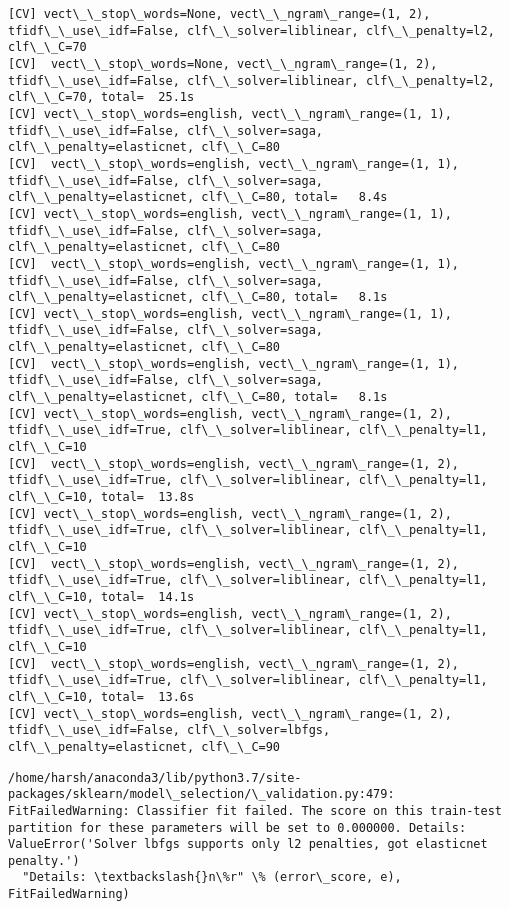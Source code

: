 \documentclass[11pt]{article}
\begin{document}
\begin{Verbatim}[commandchars=\\\{\}]
[CV] vect\_\_stop\_words=None, vect\_\_ngram\_range=(1, 2), tfidf\_\_use\_idf=False, clf\_\_solver=liblinear, clf\_\_penalty=l2, clf\_\_C=70 
[CV]  vect\_\_stop\_words=None, vect\_\_ngram\_range=(1, 2), tfidf\_\_use\_idf=False, clf\_\_solver=liblinear, clf\_\_penalty=l2, clf\_\_C=70, total=  25.1s
[CV] vect\_\_stop\_words=english, vect\_\_ngram\_range=(1, 1), tfidf\_\_use\_idf=False, clf\_\_solver=saga, clf\_\_penalty=elasticnet, clf\_\_C=80 
[CV]  vect\_\_stop\_words=english, vect\_\_ngram\_range=(1, 1), tfidf\_\_use\_idf=False, clf\_\_solver=saga, clf\_\_penalty=elasticnet, clf\_\_C=80, total=   8.4s
[CV] vect\_\_stop\_words=english, vect\_\_ngram\_range=(1, 1), tfidf\_\_use\_idf=False, clf\_\_solver=saga, clf\_\_penalty=elasticnet, clf\_\_C=80 
[CV]  vect\_\_stop\_words=english, vect\_\_ngram\_range=(1, 1), tfidf\_\_use\_idf=False, clf\_\_solver=saga, clf\_\_penalty=elasticnet, clf\_\_C=80, total=   8.1s
[CV] vect\_\_stop\_words=english, vect\_\_ngram\_range=(1, 1), tfidf\_\_use\_idf=False, clf\_\_solver=saga, clf\_\_penalty=elasticnet, clf\_\_C=80 
[CV]  vect\_\_stop\_words=english, vect\_\_ngram\_range=(1, 1), tfidf\_\_use\_idf=False, clf\_\_solver=saga, clf\_\_penalty=elasticnet, clf\_\_C=80, total=   8.1s
[CV] vect\_\_stop\_words=english, vect\_\_ngram\_range=(1, 2), tfidf\_\_use\_idf=True, clf\_\_solver=liblinear, clf\_\_penalty=l1, clf\_\_C=10 
[CV]  vect\_\_stop\_words=english, vect\_\_ngram\_range=(1, 2), tfidf\_\_use\_idf=True, clf\_\_solver=liblinear, clf\_\_penalty=l1, clf\_\_C=10, total=  13.8s
[CV] vect\_\_stop\_words=english, vect\_\_ngram\_range=(1, 2), tfidf\_\_use\_idf=True, clf\_\_solver=liblinear, clf\_\_penalty=l1, clf\_\_C=10 
[CV]  vect\_\_stop\_words=english, vect\_\_ngram\_range=(1, 2), tfidf\_\_use\_idf=True, clf\_\_solver=liblinear, clf\_\_penalty=l1, clf\_\_C=10, total=  14.1s
[CV] vect\_\_stop\_words=english, vect\_\_ngram\_range=(1, 2), tfidf\_\_use\_idf=True, clf\_\_solver=liblinear, clf\_\_penalty=l1, clf\_\_C=10 
[CV]  vect\_\_stop\_words=english, vect\_\_ngram\_range=(1, 2), tfidf\_\_use\_idf=True, clf\_\_solver=liblinear, clf\_\_penalty=l1, clf\_\_C=10, total=  13.6s
[CV] vect\_\_stop\_words=english, vect\_\_ngram\_range=(1, 2), tfidf\_\_use\_idf=False, clf\_\_solver=lbfgs, clf\_\_penalty=elasticnet, clf\_\_C=90 

    \end{Verbatim}

    \begin{Verbatim}[commandchars=\\\{\}]
/home/harsh/anaconda3/lib/python3.7/site-packages/sklearn/model\_selection/\_validation.py:479: FitFailedWarning: Classifier fit failed. The score on this train-test partition for these parameters will be set to 0.000000. Details: 
ValueError('Solver lbfgs supports only l2 penalties, got elasticnet penalty.')
  "Details: \textbackslash{}n\%r" \% (error\_score, e), FitFailedWarning)

    \end{Verbatim}
\end{document}
